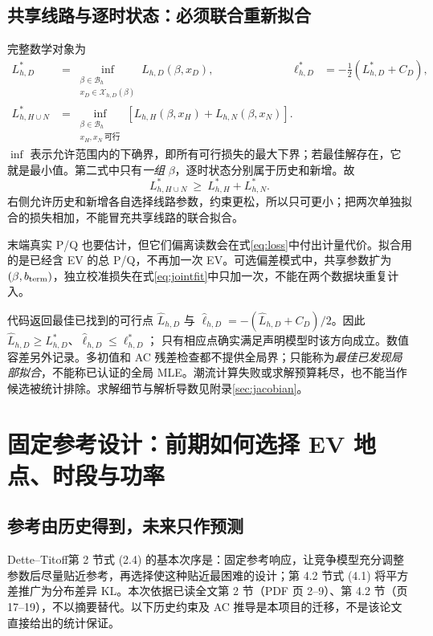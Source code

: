 \documentclass[UTF8,fontset=fandol,11pt,a4paper]{ctexart}
\begin{document}
\subsection{共享线路与逐时状态：必须联合重新拟合}
完整数学对象为
\begin{align}
 L_{h,D}^*&=\inf_{\substack{\beta\in\mathcal B_h\\
                         x_D\in\mathcal X_{h,D}(\beta)}}L_{h,D}(\beta,x_D),
 &\ell_{h,D}^*&=-\tfrac12(L_{h,D}^*+C_D),\label{eq:localglobal}\\
 L_{h,H\cup N}^*&=
 \inf_{\substack{\beta\in\mathcal B_h\\x_H,x_N\ \text{可行}}}
       \left[L_{h,H}(\beta,x_H)+L_{h,N}(\beta,x_N)\right].
 \label{eq:jointfit}
\end{align}
$\inf$ 表示允许范围内的下确界，即所有可行损失的最大下界；若最佳解存在，它就是最小值。第二式中只有\emph{一组} $\beta$，逐时状态分别属于历史和新增。故
\[
 L_{h,H\cup N}^*\ \ge\ L_{h,H}^*+L_{h,N}^*.
\]
右侧允许历史和新增各自选择线路参数，约束更松，所以只可更小；把两次单独拟合的损失相加，不能冒充共享线路的联合拟合。

末端真实 P/Q 也要估计，但它们偏离读数会在式\eqref{eq:loss}中付出计量代价。拟合用的是已经含 EV 的总 P/Q，不再加一次 EV。可选偏差模式中，共享参数扩为 $(\beta,b_{\rm term})$，独立校准损失在式\eqref{eq:jointfit}中只加一次，不能在两个数据块重复计入。

代码返回最佳已找到的可行点 $\widehat L_{h,D}$ 与
$\widehat\ell_{h,D}=-(\widehat L_{h,D}+C_D)/2$。因此
$\widehat L_{h,D}\ge L_{h,D}^*$、$\widehat\ell_{h,D}\le\ell_{h,D}^*$；
只有相应点确实满足声明模型时该方向成立。数值容差另外记录。多初值和 AC 残差检查都不提供全局界；只能称为\emph{最佳已发现局部拟合}，不能称已认证的全局 MLE。潮流计算失败或求解预算耗尽，也不能当作候选被统计排除。求解细节与解析导数见附录\ref{sec:jacobian}。

\section{固定参考设计：前期如何选择 EV 地点、时段与功率}
\label{sec:design}
\subsection{参考由历史得到，未来只作预测}
Dette--Titoff\cite{dette}第 2 节式 (2.4) 的基本次序是：固定参考响应，让竞争模型充分调整参数后尽量贴近参考，再选择使这种贴近最困难的设计；第 4.2 节式 (4.1) 将平方差推广为分布差异 KL。本次依据已读全文第 2 节（PDF 页 2--9）、第 4.2 节（页 17--19），不以摘要替代。以下历史约束及 AC 推导是本项目的迁移，不是该论文直接给出的统计保证。
\end{document}
